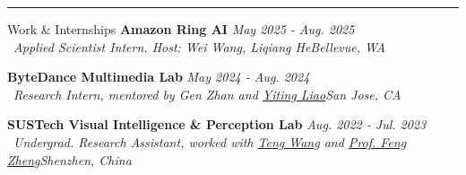 \vspace{10pt}
\hrule
\begin{rSection}{Work \& Internships}
\textbf{Amazon Ring AI} \hfill \textit{May 2025 - Aug. 2025} \\
    ~\textit{Applied Scientist Intern. Host: Wei Wang, Liqiang He\hfill Bellevue, WA}


    \textbf{ByteDance Multimedia Lab} \hfill \textit{May 2024 - Aug. 2024} \\
    ~\textit{Research Intern, mentored by Gen Zhan and \href{https://scholar.google.com/citations?user=YdkNEBkAAAAJ}{Yiting Liao}\hfill San Jose, CA}
    

    \textbf{SUSTech Visual Intelligence \& Perception Lab} \hfill \textit{Aug. 2022 - Jul. 2023}\\
    ~\textit{Undergrad. Research Assistant, worked with \href{http://ttengwang.com/}{Teng Wang} and \href{https://scholar.google.com/citations?user=PcmyXHMAAAAJ}{Prof. Feng Zheng}\hfill Shenzhen, China}
    

\end{rSection}

